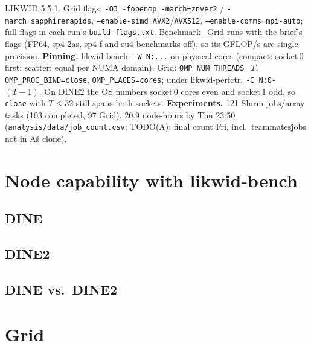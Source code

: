 \documentclass[9pt,a4paper,twocolumn]{extarticle}
\begin{document}
LIKWID 5.5.1. Grid flags: \texttt{-O3 -fopenmp -march=znver2} / \texttt{-march=sapphirerapids},
\texttt{--enable-simd=AVX2}/\texttt{AVX512}, \texttt{--enable-comms=mpi-auto}; full flags in each run's
\texttt{build-flags.txt}. %
Benchmark\_Grid runs with the brief's flags (FP64, sp4-2as, sp4-f and su4 benchmarks off), so its
GFLOP/s are single precision.
\textbf{Pinning.} likwid-bench: \texttt{-W N:...} on physical cores (compact: socket\,0 first;
scatter: equal per NUMA domain). Grid: \texttt{OMP\_NUM\_THREADS}=$T$, \texttt{OMP\_PROC\_BIND=close},
\texttt{OMP\_PLACES=cores}; under likwid-perfctr, \texttt{-C N:0-}$(T{-}1)$. On DINE2 the OS numbers
socket\,0 cores even and socket\,1 odd, so \texttt{close} with $T\le32$ still spans both sockets.
\textbf{Experiments.} 121 Slurm jobs/array tasks (103 completed, 97 Grid), 20.9 node-hours by Thu 23:50 (\texttt{analysis/data/job\_count.csv}; TODO(A): final count Fri, incl.\ teammates\' jobs not in A\'s clone).

\section{Node capability with likwid-bench}  %
\subsection{DINE}
\subsection{DINE2}
\subsection{DINE vs.\ DINE2}  %

\section{Grid}              %

\end{document}

